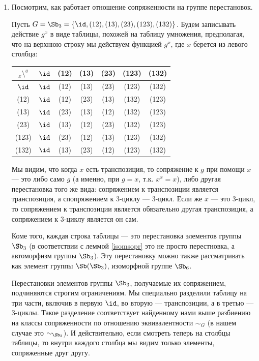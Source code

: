 \begin{enumerate}


\item Посмотрим, как работает отношение сопряженности на группе перестановок.

Пусть $G=\Sb_3 = \{\id,(12),(13),(23),(123),(132)\}$. Будем записывать действие $g^x$ в виде таблицы, похожей на таблицу умножения, предполагая, что на верхнюю строку мы действуем функцией $g^x$, где $x$ берется из левого столбца:
\begin{center}
\begin{tabular}{c|c|ccc|cc}
${}_x\setminus^g$&  $\id$	& (12)	& (13)	& (23)	& (123)	& (132) \\ \hline
$\id$&$\id$	& (12)	& (13)	& (23)	& (123)	& (132) \\
(12)& $\id$	& (12)	& (23)	& (13)	& (132)	& (123) \\
(13)& $\id$	& (23)	& (13)	& (12)	& (132)	& (123) \\
(23)& $\id$	& (13)	& (12)	& (23)	& (132)	& (123) \\
(123)&$\id$	& (23)	& (12)	& (13)	& (123)	& (132) \\
(132)&$\id$	& (13)	& (23)	& (12)	& (123)	& (132)
\end{tabular}
\end{center}
Мы видим, что когда $x$ есть транспозиция, то сопряжение к $g$ при помощи $x$ --- это либо само $g$ (а именно, при $g=x$, т.к. $x^x=x$), либо другая перестановка того же вида: сопряжением к транспозиции является транспозиция, а спопряжением к 3-циклу --- 3-цикл. Если же $x$ --- это 3-цикл, то сопряжением к транспозиции является обязательно другая транспозиция, а сопряжением к 3-циклу является он сам.

Коме того, каждая строка таблицы --- это перестановка элементов группы $\Sb_3$ (в соответствии с леммой \ref{isomsopr} это не просто перестновка, а автоморфизм группы $\Sb_3$). Эту перестановку можно также рассматривать как элемент группы $\Sb(\Sb_3)$, изоморфной группе $\Sb_6$.

Перестановки элементов группы $\Sb_3$, получаемые их сопряжением, подчиняются строгим ограничениям. Мы специально разделили таблицу на три части, включив в первую $\id$, во вторую --- транспозиции, а в третью --- 3-циклы. Такое разделение соответствует найденному нами выше 
разбиению на классы сопряженности по
отношению эквивалентности $\sim_G$ (в нашем случае это $\sim_{\Sb_3}$). И действительно, если смотреть теперь на столбцы таблицы, то внутри каждого столбца мы видим только элементы, сопряженные друг другу.


\end{enumerate}
